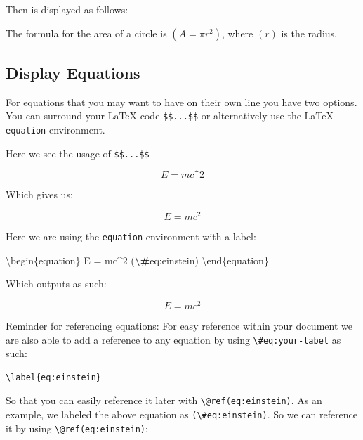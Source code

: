 \documentclass[
]{book}
\newenvironment{Shaded}{\begin{snugshade}}{\end{snugshade}}
\newcommand{\NormalTok}[1]{#1}
\newcommand{\SpecialCharTok}[1]{\textcolor[rgb]{0.81,0.36,0.00}{\textbf{#1}}}
\theoremstyle{definition}
\theoremstyle{definition}
\theoremstyle{definition}
\theoremstyle{definition}
\theoremstyle{remark}
\begin{document}
Then is displayed as follows:

The formula for the area of a circle is \(( A = \pi r^2 )\), where \(( r )\) is the radius.

\subsection{Display Equations}\label{display-equations}

For equations that you may want to have on their own line you have two options. You can surround your LaTeX code \texttt{\$\$...\$\$} or alternatively use the LaTeX \texttt{equation} environment.

Here we see the usage of \texttt{\$\$...\$\$}

\begin{Shaded}
\begin{Highlighting}[]
\NormalTok{$$}
\NormalTok{E = mc\^{}2}
\NormalTok{$$}
\end{Highlighting}
\end{Shaded}

Which gives us:

\[
E = mc^2
\]

Here we are using the \texttt{equation} environment with a label:

\begin{Shaded}
\begin{Highlighting}[]
\NormalTok{\textbackslash{}begin\{equation\}}
\NormalTok{  E = mc\^{}2}
\NormalTok{  (}\SpecialCharTok{\textbackslash{}\#}\NormalTok{eq:einstein)}
\NormalTok{\textbackslash{}end\{equation\}}
\end{Highlighting}
\end{Shaded}

Which outputs as such:

\begin{equation}
  E = mc^2
  \label{eq:einstein}
\end{equation}

Reminder for referencing equations: For easy reference within your document we are also able to add a reference to any equation by using \texttt{\textbackslash{}\#eq:your-label} as such:

\begin{verbatim}
\label{eq:einstein}
\end{verbatim}

So that you can easily reference it later with \texttt{\textbackslash{}@ref(eq:einstein)}. As an example, we labeled the above equation as \texttt{(\textbackslash{}\#eq:einstein)}. So we can reference it by using \texttt{\textbackslash{}@ref(eq:einstein)}:
\end{document}

